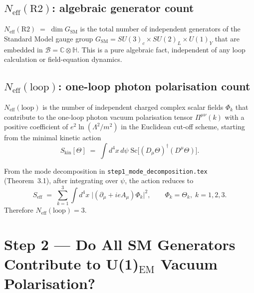\documentclass[12pt,a4paper]{article}
\theoremstyle{remark}
\newcommand{\Neff}{N_{\mathrm{eff}}}
\begin{document}
\subsection{$\Neff(\mathrm{R2})$: algebraic generator count}

\begin{definition}[$\Neff(\mathrm{R2})$]
$\Neff(\mathrm{R2}) \;=\; \dim G_{\mathrm{SM}}$ is the total number of
independent generators of the Standard Model gauge group
$G_{\mathrm{SM}} = SU(3)_c\times SU(2)_L\times U(1)_Y$ that are embedded
in $\mathcal{B} = \mathbb{C}\otimes\mathbb{H}$.
This is a pure algebraic fact, independent of any loop calculation or
field-equation dynamics.
\end{definition}

\subsection{$\Neff(\mathrm{loop})$: one-loop photon polarisation count}

\begin{definition}[$\Neff(\mathrm{loop})$]
$\Neff(\mathrm{loop})$ is the number of independent charged complex scalar
fields $\Phi_k$ that contribute to the one-loop photon vacuum polarisation
tensor $\Pi^{\mu\nu}(k)$ with a positive coefficient of
$e^2 \ln(\Lambda^2/m^2)$ in the Euclidean cut-off scheme, starting from
the minimal kinetic action
\begin{equation}
  S_{\mathrm{kin}}[\Theta]
  \;=\; \int d^4x\,d\psi\;
  \mathrm{Sc}\!\bigl[(D_\mu\Theta)^\dagger(D^\mu\Theta)\bigr].
  \label{eq:S_kin}
\end{equation}
\end{definition}

From the mode decomposition in \texttt{step1\_mode\_decomposition.tex}
(Theorem~3.1), after integrating over $\psi$, the action reduces to
\begin{equation}
  S_{\mathrm{eff}} \;=\; \sum_{k=1}^{3}
  \int d^4x\;\bigl|({\partial}_\mu + ieA_\mu)\Phi_k\bigr|^2,
  \qquad \Phi_k = \Theta_k,\; k=1,2,3.
  \label{eq:S_eff}
\end{equation}
Therefore $\Neff(\mathrm{loop}) = 3$.

\section{Step 2 — Do All SM Generators Contribute to U(1)$_{\mathrm{EM}}$
         Vacuum Polarisation?}
\label{sec:contributions}
\end{document}
